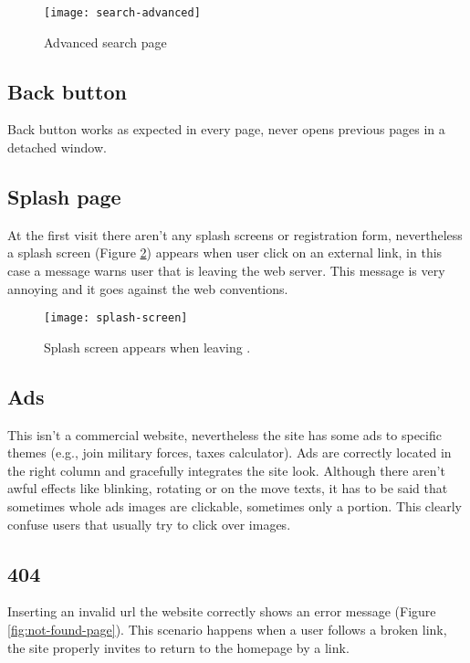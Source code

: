 \documentclass[
10pt, %
a4paper, %
oneside, %
headinclude,footinclude, %
BCOR5mm, %
]{scrartcl}
\begin{document}
	\begin{figure}[h]
	\centering 
	\centerline{\texttt{[image: search-advanced]}}
	\caption[Advanced search page]{Advanced search page}
	\label{fig:search-advanced} 
	\end{figure}

	\newpage
	\subsection{Back button}
	Back button works as expected in every page, never opens previous pages in a detached window.

	\newpage
	\subsection{Splash page}
	\label{splashpage}
	At the first visit there aren't any splash screens or registration form, nevertheless a splash screen (Figure \ref{fig:splash-screen}) appears when user click on an external link, in this case a message warns user that is leaving the \thesite{} web server. This message is very annoying and it goes against the web conventions.

	\begin{figure}[h]
	\centering 
	\centerline{\texttt{[image: splash-screen]}}
	\caption[Splash screen]{Splash screen appears when leaving \thesite{}.}
	\label{fig:splash-screen} 
	\end{figure}

	\subsection{Ads}
	This isn't a commercial website, nevertheless the site has some ads to specific themes (e.g., join military forces, taxes calculator). Ads are correctly located in the right column and gracefully integrates the site look. Although there aren't awful effects like blinking, rotating or on the move texts, it has to be said that sometimes whole ads images are clickable, sometimes only a portion. This clearly confuse users that usually try to click over images.

	\subsection{404}
	Inserting an invalid url the website correctly shows an error message (Figure \ref{fig:not-found-page}). This scenario happens when a user follows a broken link, the site properly invites to return to the homepage by a link. 
\end{document}
